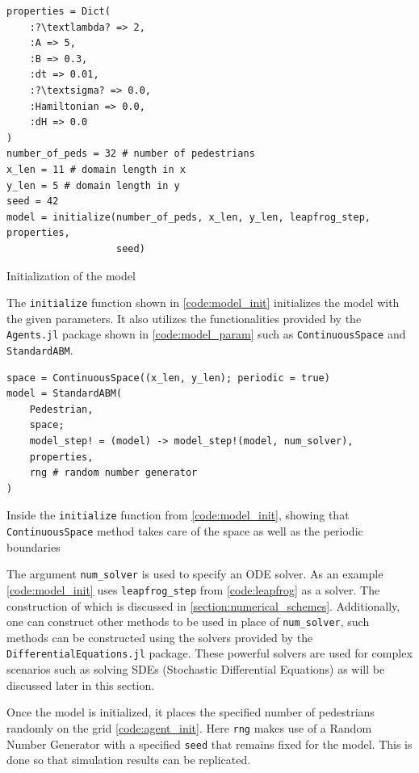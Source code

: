 \begin{listing}[H]
\begin{verbatim}
properties = Dict(
    :?\textlambda? => 2, 
    :A => 5,
    :B => 0.3, 
    :dt => 0.01,
    :?\textsigma? => 0.0,
    :Hamiltonian => 0.0,
    :dH => 0.0
)
number_of_peds = 32 # number of pedestrians
x_len = 11 # domain length in x
y_len = 5 # domain length in y
seed = 42
model = initialize(number_of_peds, x_len, y_len, leapfrog_step, properties,
                   seed)
\end{verbatim}
\caption{Initialization of the model}
\label{code:model_init}
\end{listing}
The \texttt{initialize} function shown in \autoref{code:model_init} initializes the model with the given parameters. It also utilizes the functionalities provided by the \texttt{Agents.jl} package shown in \autoref{code:model_param} such as \texttt{ContinuousSpace} and \texttt{StandardABM}.
\begin{listing}[H]
\begin{verbatim}
space = ContinuousSpace((x_len, y_len); periodic = true)
model = StandardABM(
    Pedestrian,
    space;
    model_step! = (model) -> model_step!(model, num_solver),
    properties,
    rng # random number generator
)
\end{verbatim}
\caption{Inside the \texttt{initialize} function from \autoref{code:model_init}, showing that \texttt{ContinuousSpace} method takes care of the space as well as the periodic boundaries}
\label{code:model_param}
\end{listing}


The argument \texttt{num\_solver} is used to specify an ODE solver. As an example \autoref{code:model_init} uses \texttt{leapfrog\_step} from \autoref{code:leapfrog} as a solver. The construction of which is discussed in \autoref{section:numerical_schemes}. Additionally, one can construct other methods to be used in place of \texttt{num\_solver}, such methods can be constructed using the solvers provided by the \texttt{DifferentialEquations.jl} package. These powerful solvers are used for complex scenarios such as solving SDEs (Stochastic Differential Equations) as will be discussed later in this section.

Once the model is initialized, it places the specified number of pedestrians randomly on the grid \autoref{code:agent_init}. Here \texttt{rng} makes use of a Random Number Generator with a specified \texttt{seed} that remains fixed for the model. This is done so that simulation results can be replicated.

